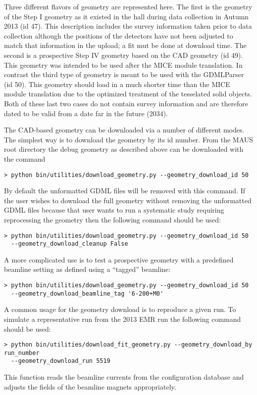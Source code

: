 Three different flavors of geometry are represented here. The first is
the geometry of the Step I geometry as it existed in the hall during
data collection in Autumn 2013 (id 47). This description includes the
survey information taken prior to data collection although the
positions of the detectors have not been adjusted to match that
information in the upload; a fit mut be done at download time. The
second is a prospective Step IV geometry based on the CAD geometry (id
49). This geometry was intended to be used after the MICE module
translation. In contrast the third type of geometry is meant to be
used with the GDMLParser (id 50). This geometry should load in a much
shorter time than the MICE module translation due to the optimized
treatment of the tesselated solid objects. Both of these last two
cases do not contain survey information and are therefore dated to be
valid from a date far in the future (2034).

The CAD-based geometry can be downloaded via a number of different
modes. The simplest way is to download the geometry by its id
number. From the MAUS root directory the debug geometry as described
above can be downloaded with the command
\begin{verbatim}
> python bin/utilities/download_geometry.py --geometry_download_id 50
\end{verbatim}
By default the unformatted GDML files will be removed with this
command. If the user wishes to download the full geometry without
removing the unformatted GDML files because that user wants to run a systematic
study requiring reprocessing the geometry then the following command
should be used:
\begin{verbatim}
> python bin/utilities/download_geometry.py --geometry_download_id 50
  --geometry_download_cleanup False
\end{verbatim}
A more complicated use is to test a prospective geometry with a
predefined beamline setting as defined using a ``tagged'' beamline:
\begin{verbatim}
> python bin/utilities/download_geometry.py --geometry_download_id 50
  --geometry_download_beamline_tag '6-200+M0'
\end{verbatim}

A common usage for the geometry download is to reproduce a given
run. To simulate a representative run from the 2013 EMR run the
following command should be used:
\begin{verbatim}
> python bin/utilities/download_fit_geometry.py --geometry_download_by run_number
  --geometry_download_run 5519
\end{verbatim}
This function reads the beamline currents from the configuration
database and adjusts the fields of the beamline magnets appropriately.

